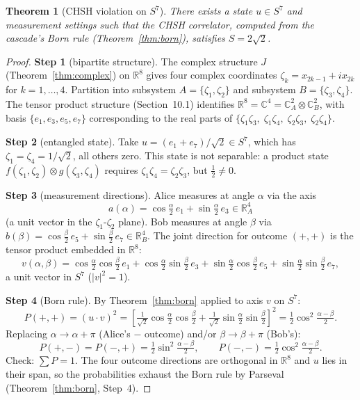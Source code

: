 \documentclass[12pt,a4paper]{article}
\newtheorem{theorem}{Theorem}[section]
\begin{document}
\begin{theorem}[CHSH violation on $S^7$]\label{thm:bell}
There exists a state $u\in S^7$ and measurement settings such that the CHSH correlator,
computed from the cascade's Born rule (Theorem~\ref{thm:born}), satisfies $S = 2\sqrt{2}$.
\end{theorem}
\begin{proof}
\textbf{Step 1} (bipartite structure). The complex structure $J$
(Theorem~\ref{thm:complex}) on $\mathbb{R}^8$ gives four complex coordinates
$\zeta_k = x_{2k-1}+ix_{2k}$ for $k=1,\ldots,4$. Partition into subsystem
$A=\{\zeta_1,\zeta_2\}$ and subsystem $B=\{\zeta_3,\zeta_4\}$. The tensor product
structure (Section~10.1) identifies $\mathbb{R}^8 = \mathbb{C}^4 =
\mathbb{C}^2_A\otimes\mathbb{C}^2_B$, with basis $\{e_1,e_3,e_5,e_7\}$ corresponding to
the real parts of $\{\zeta_1\zeta_3,\;\zeta_1\zeta_4,\;\zeta_2\zeta_3,\;\zeta_2\zeta_4\}$.

\textbf{Step 2} (entangled state). Take
$u = (e_1+e_7)/\sqrt{2}\in S^7$,
which has $\zeta_1=\zeta_4=1/\sqrt{2}$, all others zero. This state is not separable:
a product state $f(\zeta_1,\zeta_2)\otimes g(\zeta_3,\zeta_4)$ requires
$\zeta_1\zeta_4 = \zeta_2\zeta_3$, but $\tfrac{1}{2}\neq 0$.

\textbf{Step 3} (measurement directions). Alice measures at angle $\alpha$ via the axis
\[
a(\alpha) = \cos\tfrac{\alpha}{2}\,e_1 + \sin\tfrac{\alpha}{2}\,e_3\in\mathbb{R}^4_A
\]
(a unit vector in the $\zeta_1$-$\zeta_2$ plane). Bob measures at angle $\beta$ via
$b(\beta) = \cos\tfrac{\beta}{2}\,e_5 + \sin\tfrac{\beta}{2}\,e_7\in\mathbb{R}^4_B$.
The joint direction for outcome $(+,+)$ is the tensor product embedded in $\mathbb{R}^8$:
\[
v(\alpha,\beta) = \cos\tfrac{\alpha}{2}\cos\tfrac{\beta}{2}\,e_1
+ \cos\tfrac{\alpha}{2}\sin\tfrac{\beta}{2}\,e_3
+ \sin\tfrac{\alpha}{2}\cos\tfrac{\beta}{2}\,e_5
+ \sin\tfrac{\alpha}{2}\sin\tfrac{\beta}{2}\,e_7,
\]
a unit vector in $S^7$ ($|v|^2 = 1$).

\textbf{Step 4} (Born rule). By Theorem~\ref{thm:born} applied to axis $v$ on $S^7$:
\[
P(+,+) = (u\cdot v)^2 = \left[\tfrac{1}{\sqrt{2}}\cos\tfrac{\alpha}{2}\cos\tfrac{\beta}{2}
+ \tfrac{1}{\sqrt{2}}\sin\tfrac{\alpha}{2}\sin\tfrac{\beta}{2}\right]^2
= \tfrac{1}{2}\cos^2\!\tfrac{\alpha-\beta}{2}.
\]
Replacing $\alpha\to\alpha+\pi$ (Alice's $-$ outcome) and/or $\beta\to\beta+\pi$ (Bob's):
\[
P(+,-) = P(-,+) = \tfrac{1}{2}\sin^2\!\tfrac{\alpha-\beta}{2},\qquad
P(-,-) = \tfrac{1}{2}\cos^2\!\tfrac{\alpha-\beta}{2}.
\]
Check: $\sum P = 1$. The four outcome directions are orthogonal in $\mathbb{R}^8$ and
$u$ lies in their span, so the probabilities exhaust the Born rule by Parseval
(Theorem~\ref{thm:born}, Step~4).


\end{proof}
\end{document}
